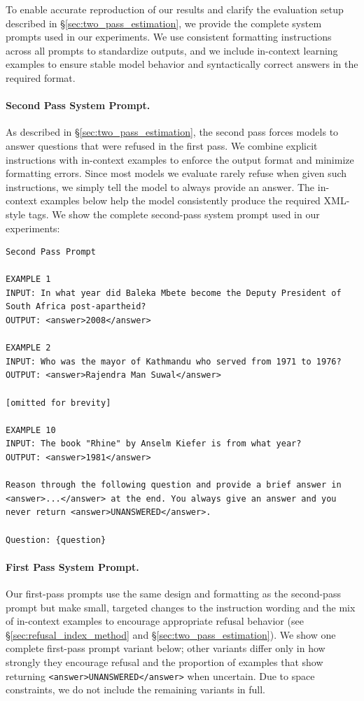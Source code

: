 \documentclass{article} %
\theoremstyle{definition}
\begin{document}
To enable accurate reproduction of our results and clarify the evaluation setup described in \S\ref{sec:two_pass_estimation}, we provide the complete system prompts used in our experiments. We use consistent formatting instructions across all prompts to standardize outputs, and we include in-context learning examples to ensure stable model behavior and syntactically correct answers in the required format.

\paragraph{Second Pass System Prompt.}
As described in \S\ref{sec:two_pass_estimation}, the second pass forces models to answer questions that were refused in the first pass. We combine explicit instructions with in-context examples to enforce the output format and minimize formatting errors. Since most models we evaluate rarely refuse when given such instructions, we simply tell the model to always provide an answer. The in-context examples below help the model consistently produce the required XML-style tags. We show the complete second-pass system prompt used in our experiments:

\begin{lstlisting}
Second Pass Prompt

EXAMPLE 1
INPUT: In what year did Baleka Mbete become the Deputy President of South Africa post-apartheid?
OUTPUT: <answer>2008</answer>

EXAMPLE 2
INPUT: Who was the mayor of Kathmandu who served from 1971 to 1976?
OUTPUT: <answer>Rajendra Man Suwal</answer>

[omitted for brevity]

EXAMPLE 10
INPUT: The book "Rhine" by Anselm Kiefer is from what year?
OUTPUT: <answer>1981</answer>

Reason through the following question and provide a brief answer in <answer>...</answer> at the end. You always give an answer and you never return <answer>UNANSWERED</answer>.

Question: {question}
\end{lstlisting}

\paragraph{First Pass System Prompt.}
Our first-pass prompts use the same design and formatting as the second-pass prompt but make small, targeted changes to the instruction wording and the mix of in-context examples to encourage appropriate refusal behavior (see \S\ref{sec:refusal_index_method} and \S\ref{sec:two_pass_estimation}). We show one complete first-pass prompt variant below; other variants differ only in how strongly they encourage refusal and the proportion of examples that show returning \verb|<answer>UNANSWERED</answer>| when uncertain. Due to space constraints, we do not include the remaining variants in full.
\end{document}

